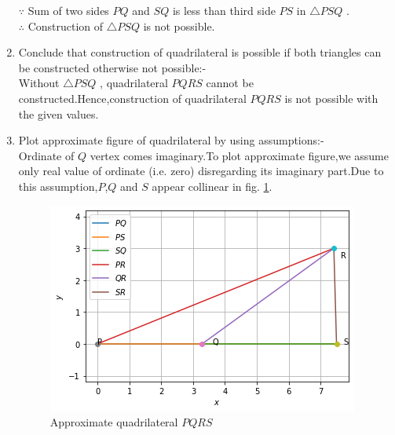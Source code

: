 \documentclass[journal,12pt,twocolumn]{IEEEtran}
\begin{document}
\begin{enumerate}
    $\because$ Sum of two sides $PQ$ and $SQ$ is less than third side $PS$ in $\triangle PSQ$ .
    \\
    $\therefore$ Construction of $\triangle PSQ$ is not possible.
    
    \item Conclude that construction of quadrilateral is possible if both triangles can be constructed otherwise not possible:-
    \\
    Without $\triangle PSQ$ , quadrilateral $PQRS$ cannot be constructed.Hence,construction of quadrilateral $PQRS$ is not possible with the given values.
    
    \item Plot approximate figure of quadrilateral by using assumptions:-
    \\
    Ordinate of $Q$ vertex comes imaginary.To plot approximate figure,we assume only real value of ordinate (i.e. zero) disregarding its imaginary part.Due to this assumption,$P$,$Q$ and $S$ appear collinear in fig. \ref{fig:quadrilateral}.
    
    \begin{figure}[!ht]
    \centering
    \includegraphics[width=\columnwidth]{Figure2}
    \caption{Approximate quadrilateral $PQRS$}
    \label{fig:quadrilateral}	
    \end{figure}
    
\end{enumerate}
\end{document}
